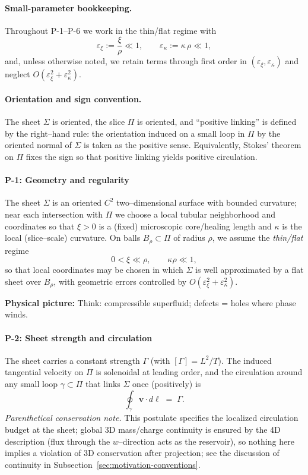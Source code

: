 \paragraph*{Small-parameter bookkeeping.}
Throughout P-1–P-6 we work in the thin/flat regime with
\[
\varepsilon_\xi := \frac{\xi}{\rho}\ll 1,\qquad
\varepsilon_\kappa := \kappa\,\rho \ll 1,
\]
and, unless otherwise noted, we retain terms through first order in $(\varepsilon_\xi,\varepsilon_\kappa)$ and neglect $O(\varepsilon_\xi^2+\varepsilon_\kappa^2)$.

\paragraph*{Orientation and sign convention.}
The sheet $\Sigma$ is oriented, the slice $\Pi$ is oriented, and “positive linking'' is defined by the right–hand rule: the orientation induced on a small loop in $\Pi$ by the oriented normal of $\Sigma$ is taken as the positive sense. Equivalently, Stokes' theorem on $\Pi$ fixes the sign so that positive linking yields positive circulation.

\paragraph{P-1: Geometry and regularity}
\label{post:P1}
The sheet $\Sigma$ is an oriented $C^2$ two–dimensional surface with bounded curvature; near each intersection with $\Pi$ we choose a local tubular neighborhood and coordinates so that $\xi>0$ is a (fixed) microscopic core/healing length and $\kappa$ is the local (slice–scale) curvature. On balls $B_\rho\subset\Pi$ of radius $\rho$, we assume the \emph{thin/flat} regime
\[
0<\xi \ll \rho, \qquad \kappa\rho \ll 1,
\]
so that local coordinates may be chosen in which $\Sigma$ is well approximated by a flat sheet over $B_\rho$, with geometric errors controlled by $O(\varepsilon_\xi^2+\varepsilon_\kappa^2)$.

\begin{physbox}\textbf{Physical picture:} Think: compressible superfluid; defects = holes where phase winds.\end{physbox}

\paragraph{P-2: Sheet strength and circulation}
\label{post:P2}
The sheet carries a constant strength $\Gamma$ (with $[\Gamma]=L^2/T$). The induced tangential velocity on $\Pi$ is solenoidal at leading order, and the circulation around any small loop $\gamma\subset\Pi$ that links $\Sigma$ once (positively) is
\[
\oint_{\gamma}\mathbf{v}\cdot d\boldsymbol{\ell}\;=\;\Gamma.
\]
\emph{Parenthetical conservation note.} This postulate specifies the localized circulation budget at the sheet; global 3D mass/charge continuity is ensured by the 4D description (flux through the $w$–direction acts as the reservoir), so nothing here implies a violation of 3D conservation after projection; see the discussion of continuity in Subsection~\ref{sec:motivation-conventions}.

